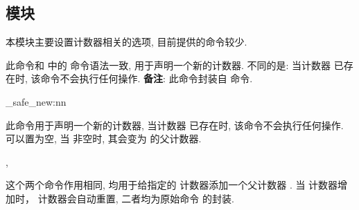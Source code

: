 \clearpage
\subsection{ 模块}
本模块主要设置计数器相关的选项, 目前提供的命令较少.


\begin{function}[added=2025-09-23]{\zcntnew}
  \begin{syntax}
  \cmd{\zcntnew}
  \end{syntax}
  此命令和  中的 \cmd{\newcounter} 命令语法一致, 
  用于声明一个新的计数器. 不同的是: 当计数器  已存在时,
  该命令不会执行任何操作. \textbf{备注}: 此命令封装自 
  命令.
\end{function}


\begin{function}[added=2025-09-23]{\zcnt_safe_new:nn}
  \begin{syntax}
   
  \end{syntax}
  此命令用于声明一个新的计数器, 当计数器  已存在时, 该命令不会执行任何操作. 
   可以置为空, 当  非空时, 其会变为  的父计数器.
\end{function}


\begin{function}[updated=2025-04-25]{\ztexcntwith, \counterwithin}
  \begin{syntax}
  \end{syntax}
  这个两个命令作用相同, 均用于给指定的  计数器添加一个父计数器 . 
  当  计数器增加时， 计数器会自动重置, 二者均为原始命令 \cmd{\@addtoreset} 的封装.
\end{function}